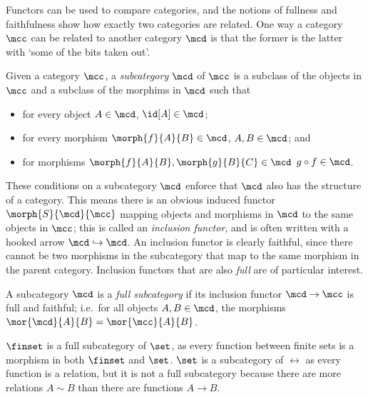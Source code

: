 Functors can be used to compare categories, and the notions of fullness and
faithfulness show how exactly two categories are related.
One way a category \(\mcc\) can be related to another category \(\mcd\) is that
the former is the latter with `some of the bits taken out'.

\begin{definition}[Subcategory]
    Given a category \(\mcc\), a \emph{subcategory} \(\mcd\) of \(\mcc\) is a
    subclass of the objects in \(\mcc\) and a subclass of the morphims in
    \(\mcd\) such that
    \begin{itemize}
        \item for every object \(A \in \mcd\), \(\id[A] \in \mcd\);
        \item for every morphism \(\morph{f}{A}{B} \in \mcd\), \(A,B \in \mcd\);
              and
        \item for morphisms \(\morph{f}{A}{B}, \morph{g}{B}{C} \in \mcd\)
              \(g \circ f \in \mcd\).
    \end{itemize}
\end{definition}

These conditions on a subcategory \(\mcd\) enforce that \(\mcd\) also has the
structure of a category.
This means there is an obvious induced functor \(\morph{S}{\mcd}{\mcc}\) mapping
objects and morphisms in \(\mcd\) to the same objects in \(\mcc\); this is
called an \emph{inclusion functor}, and is often written with a hooked arrow
\(\mcd \hookrightarrow \mcd\).
An inclusion functor is clearly faithful, since there cannot be two morphisms in
the subcategory that map to the same morphism in the parent category.
Inclusion functors that are also \emph{full} are of particular interest.

\begin{definition}
    A subcategory \(\mcd\) is a \emph{full subcategory} if its inclusion functor
    \(\mcd \to \mcc\) is full and faithful; i.e.\ for all objects
    \(A, B \in \mcd\), the morphisms \(\mor{\mcd}{A}{B} = \mor{\mcc}{A}{B}\).
\end{definition}

\begin{example}
    \(\finset\) is a full subcategory of \(\set\), as every function between
    finite sets is a morphism in both \(\finset\) and \(\set\).
    \(\set\) is a subcategory of \(\rel\) as every function is a relation, but
    it is not a full subcategory because there are more relations \(A \sim B\)
    than there are functions \(A \to B\).
\end{example}

